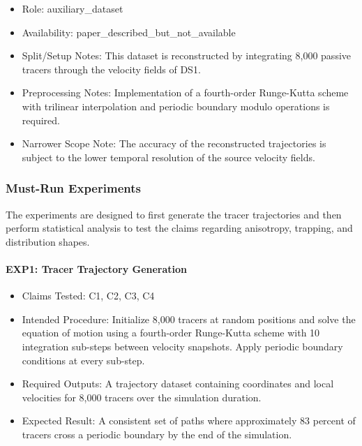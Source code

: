 \documentclass[11pt]{article}
\begin{document}
\begin{itemize}

\item Role: auxiliary\_dataset

\item Availability: paper\_described\_but\_not\_available

\item Split/Setup Notes: This dataset is reconstructed by integrating 8,000 passive tracers through the velocity fields of DS1.

\item Preprocessing Notes: Implementation of a fourth-order Runge-Kutta scheme with trilinear interpolation and periodic boundary modulo operations is required.

\item Narrower Scope Note: The accuracy of the reconstructed trajectories is subject to the lower temporal resolution of the source velocity fields.

\end{itemize}

\subsubsection*{Must-Run Experiments}

The experiments are designed to first generate the tracer trajectories and then perform statistical analysis to test the claims regarding anisotropy, trapping, and distribution shapes.

\paragraph{EXP1: Tracer Trajectory Generation}

\begin{itemize}

\item Claims Tested: C1, C2, C3, C4

\item Intended Procedure: Initialize 8,000 tracers at random positions and solve the equation of motion using a fourth-order Runge-Kutta scheme with 10 integration sub-steps between velocity snapshots. Apply periodic boundary conditions at every sub-step.

\item Required Outputs: A trajectory dataset containing coordinates and local velocities for 8,000 tracers over the simulation duration.

\item Expected Result: A consistent set of paths where approximately 83 percent of tracers cross a periodic boundary by the end of the simulation.

\end{itemize}
\end{document}
